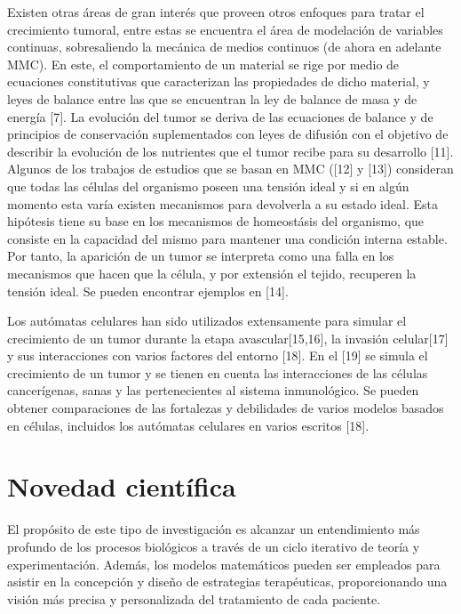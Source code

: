 \hspace{.1cm}Existen otras áreas de gran interés que proveen otros enfoques para tratar el crecimiento tumoral, entre estas se encuentra el \'area de modelaci\'on de variables continuas, sobresaliendo la mecánica de medios continuos (de ahora en adelante MMC). En este, el comportamiento de un material se rige por medio de ecuaciones constitutivas que caracterizan las propiedades de dicho material, y leyes de balance entre las que se encuentran la ley de balance de masa y de energía [7]. La evolución del tumor se deriva de las ecuaciones de balance y de principios de conservación suplementados con leyes de difusión con el objetivo de describir la evolución de los nutrientes que el tumor recibe para su desarrollo [11]. Algunos de los trabajos de estudios que se basan en MMC ([12] y [13]) consideran que todas las células del organismo poseen una tensión ideal y si en algún momento esta varía existen mecanismos para devolverla a su estado ideal. Esta hipótesis tiene su base en los mecanismos de homeost\'asis del organismo, que consiste en la capacidad del mismo para mantener una condición interna estable. Por tanto, la aparición de un tumor se interpreta como una falla en los mecanismos que hacen que la célula, y por extensión el tejido, recuperen la tensión ideal. Se pueden encontrar ejemplos en [14].

\hspace{.1cm}Los autómatas celulares han sido utilizados extensamente para simular el crecimiento de un tumor durante la etapa avascular[15,16], la invasión celular[17] y sus interacciones con varios factores del entorno [18]. En el [19] se simula el crecimiento de un tumor y se tienen en cuenta las interacciones de las células cancerígenas, sanas y las pertenecientes al sistema inmunológico. Se pueden obtener comparaciones de las fortalezas y debilidades de varios modelos basados en células, incluidos los autómatas celulares en varios escritos [18].

\section{Novedad científica} 
\hspace{.1cm}El propósito de este tipo de investigación es alcanzar un entendimiento más profundo de los procesos biológicos a través de un ciclo iterativo de teoría y experimentación. Además, los modelos matemáticos pueden ser empleados para asistir en la concepción y diseño de estrategias terapéuticas, proporcionando una visión más precisa y personalizada del tratamiento de cada paciente.


